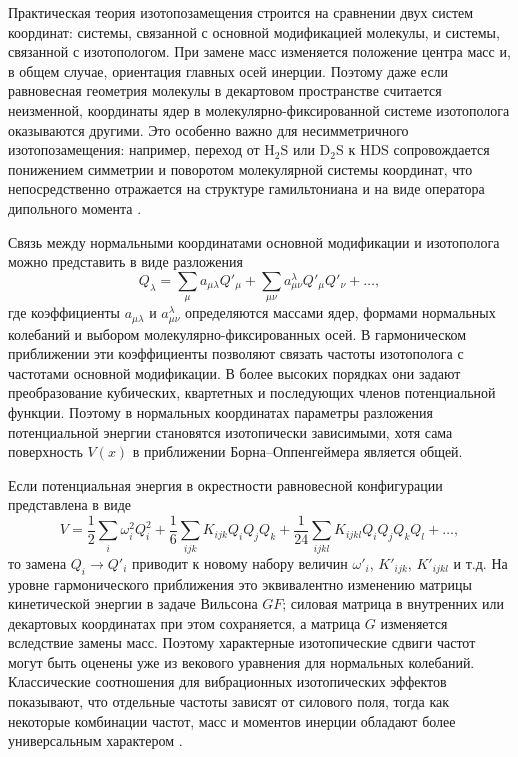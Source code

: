 Практическая теория изотопозамещения строится на сравнении двух систем
координат: системы, связанной с основной модификацией молекулы, и системы,
связанной с изотопологом. При замене масс изменяется положение центра масс и,
в общем случае, ориентация главных осей инерции. Поэтому даже если равновесная
геометрия молекулы в декартовом пространстве считается неизменной, координаты
ядер в молекулярно-фиксированной системе изотополога оказываются другими.
Это особенно важно для несимметричного изотопозамещения: например, переход от
$\mathrm{H_2S}$ или $\mathrm{D_2S}$ к $\mathrm{HDS}$ сопровождается понижением симметрии
и поворотом молекулярной системы координат, что непосредственно отражается на
структуре гамильтониана и на виде оператора дипольного момента
\cite{hds_sydow2019}.

Связь между нормальными координатами основной модификации и изотополога можно
представить в виде разложения
\begin{equation}
Q_\lambda=\sum_{\mu}a_{\mu\lambda}Q'_\mu+
\sum_{\mu\nu}a^{\lambda}_{\mu\nu}Q'_\mu Q'_\nu+\ldots,
\end{equation}
где коэффициенты $a_{\mu\lambda}$ и $a^{\lambda}_{\mu\nu}$ определяются массами ядер,
формами нормальных колебаний и выбором молекулярно-фиксированных осей.
В гармоническом приближении эти коэффициенты позволяют связать частоты
изотополога с частотами основной модификации. В более высоких порядках они
задают преобразование кубических, квартетных и последующих членов потенциальной
функции. Поэтому в нормальных координатах параметры разложения потенциальной
энергии становятся изотопически зависимыми, хотя сама поверхность $V(x)$ в
приближении Борна--Оппенгеймера является общей.

Если потенциальная энергия в окрестности равновесной конфигурации представлена
в виде
\begin{equation}
V=\frac{1}{2}\sum_i \omega_i^2 Q_i^2+
\frac{1}{6}\sum_{ijk}K_{ijk}Q_iQ_jQ_k+
\frac{1}{24}\sum_{ijkl}K_{ijkl}Q_iQ_jQ_kQ_l+\ldots,
\end{equation}
то замена $Q_i\rightarrow Q'_i$ приводит к новому набору величин
$\omega'_i$, $K'_{ijk}$, $K'_{ijkl}$ и т.д. На уровне гармонического приближения
это эквивалентно изменению матрицы кинетической энергии в задаче Вильсона
$GF$; силовая матрица в внутренних или декартовых координатах при этом
сохраняется, а матрица $G$ изменяется вследствие замены масс. Поэтому
характерные изотопические сдвиги частот могут быть оценены уже из векового
уравнения для нормальных колебаний. Классические соотношения для вибрационных
изотопических эффектов показывают, что отдельные частоты зависят от силового
поля, тогда как некоторые комбинации частот, масс и моментов инерции обладают
более универсальным характером \cite{SalantRosenthal1932,WilsonDeciusCross1955}.

